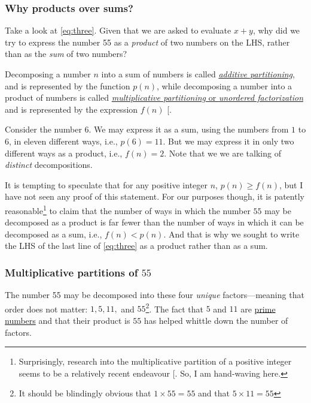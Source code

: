\documentclass[
  a4paper,
]{article}
\begin{document}
\subsubsection{Why products over sums?}\label{why-products-over-sums}

Take a look at \cref{eq:three}. Given that we are asked to evaluate
\(x + y\), why did we try to express the number 55 as a \emph{product}
of two numbers on the LHS, rather than as the \emph{sum} of two numbers?

Decomposing a number \(n\) into a sum of numbers is called
\href{https://mathworld.wolfram.com/Partition.html}{\emph{additive
partitioning}}, and is represented by the function \(p(n)\), while
decomposing a number into a product of numbers is called
\href{https://mathworld.wolfram.com/UnorderedFactorization.html}{\emph{multiplicative
partitioning} or \emph{unordered factorization}} and is represented by
the expression \(f(n)\) {[}\citeproc{ref-brown-2017}{1}{]}.

Consider the number \(6\). We may express it as a sum, using the numbers
from \(1\) to \(6\), in eleven different ways, i.e., \(p(6) = 11\). But
we may express it in only two different ways as a product, i.e.,
\(f(n)=2\). Note that we we are talking of \emph{distinct}
decompositions.

It is tempting to speculate that for any positive integer \(n\),
\(p(n) \geq f(n)\), but I have not seen any proof of this statement. For
our purposes though, it is patently reasonable\footnote{Surprisingly,
  research into the multiplicative partition of a positive integer seems
  to be a relatively recent endeavour {[}\citeproc{ref-dodd-1987}{2}{]}.
  So, I am hand-waving here.} to claim that the number of ways in which
the number \(55\) may be decomposed as a product is far fewer than the
number of ways in which it can be decomposed as a sum, i.e.,
\(f(n) < p(n)\). And that is why we sought to write the LHS of the last
line of \cref{eq:three} as a product rather than as a sum.

\subsubsection{\texorpdfstring{Multiplicative partitions of
\(55\)}{Multiplicative partitions of 55}}\label{multiplicative-partitions-of-55}

The number 55 may be decomposed into these four \emph{unique}
factors---meaning that order does not matter: \(1, 5, 11,\) and
\(55\)\footnote{It should be blindingly obvious that
  \(1 \times 55 = 55\) and that \(5 \times 11 = 55\)
  \normalfont}. The fact that \(5\) and \(11\) are
\href{https://mathworld.wolfram.com/PrimeFactor.html}{prime numbers} and
that their product is \(55\) has helped whittle down the number of
factors.
\end{document}
